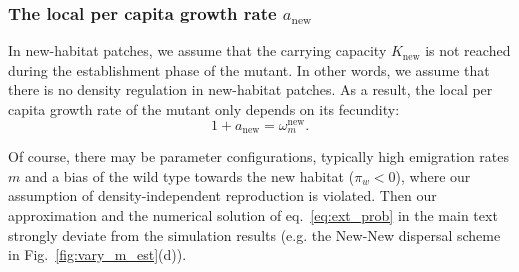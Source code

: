 \documentclass[11pt]{article}
\newcommand{\florence}[1]{\textcolor{purple}{(#1)}} %
\newcommand{\chg}[1]{\textcolor{change}{#1}}
\begin{document}

\subsubsection{The local per capita growth rate $a_{\text{new}}$}
In new-habitat patches, we assume that the carrying capacity $K_{\text{new}}$ is not reached during the establishment phase of the mutant. In other words, we assume that there is no density regulation in new-habitat patches. As a result, the local per capita growth rate of the mutant only depends on its fecundity: 
%
\begin{equation}
1 + a_{\text{new}} = \omega_m^{\text{new}}.
\end{equation}


Of course, there may be parameter configurations, typically high emigration rates $m$ and a bias of the wild type towards the new habitat ($\pi_w < 0$), where our assumption of density-independent reproduction is violated. Then our approximation and the numerical solution of eq.~\eqref{eq:ext_prob} in the main text strongly deviate from the simulation results (e.g. the New-New dispersal scheme in Fig.~\ref{fig:vary_m_est}(d)).

\newpage
\renewcommand{\theequation}{B\arabic{equation}}
\setcounter{equation}{0}  %
\end{document}
